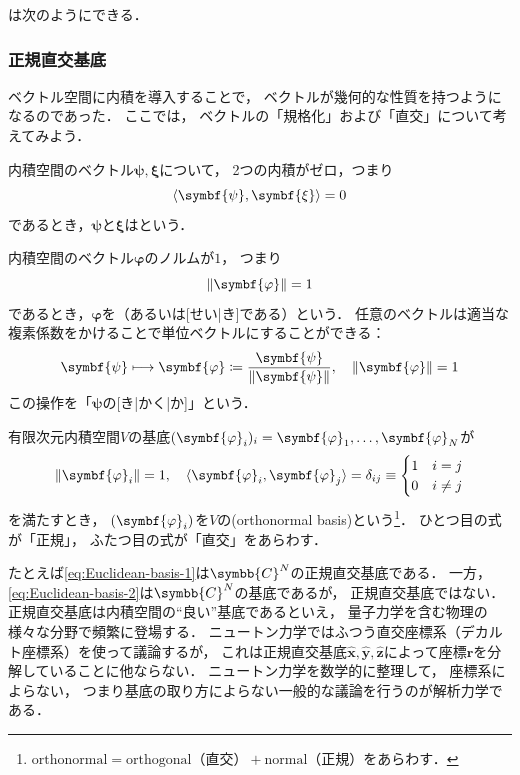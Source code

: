 \documentclass[
]{sotsu}
\newcommand{\bpsi}{\symbf{\psi}}
\newcommand{\bphi}{\symbf{\varphi}}
\newcommand{\bxi}{\symbf{\xi}}
\begin{document}
は次のようにできる．




\subsubsection{正規直交基底}
\label{sec:ONB}

ベクトル空間に内積を導入することで，
ベクトルが幾何的な性質を持つようになるのであった．
ここでは，
ベクトルの「規格化」および「直交」について考えてみよう．

内積空間のベクトル$\bpsi, \bxi$について，
2つの内積がゼロ，つまり
\begin{equation*}
    \label{eq:orthogonal}
    \iparen{\bpsi, \bxi} = 0
\end{equation*}
であるとき，$\bpsi$と$\bxi$はという．

内積空間のベクトル$\bphi$のノルムが$1$，
つまり
\begin{equation}
    \label{eq:normalization}
    \norm{\bphi} = 1
\end{equation}
であるとき，$\bphi$を（あるいは[せい|き]である）という．
任意のベクトルは適当な複素係数をかけることで単位ベクトルにすることができる：
\begin{equation*}
    \bpsi \longmapsto \bphi \coloneq \frac{\bpsi}{\norm{\bpsi}},
    \quad
    \norm{\bphi} = 1
\end{equation*}
この操作を「$\bpsi$の[き|かく|か]」という．

有限次元内積空間$V$の基底$\sequ{\bphi_i}[i] = \bphi_1, \dots, \bphi_N$が
\begin{equation}
    \label{eq:orthonormal}
    \norm{\bphi_i} = 1, 
    \quad
    \iparen{\bphi_i, \bphi_j} = 
    \kdelta_{ij} \equiv
    \begin{cases}
        1  &  i = j  \\
        0  &  i \neq j
    \end{cases}
\end{equation}
を満たすとき，
$\sequ{\bphi_i}$を$V$の(orthonormal basis)という\footnote{
    $\text{orthonormal} = \text{orthogonal（直交）} + \text{normal（正規）}$をあらわす．
}．
ひとつ目の式が「正規」，
ふたつ目の式が「直交」をあらわす．

たとえば\cref{eq:Euclidean-basis-1}は$\symbb{C}^N$の正規直交基底である．
一方，\cref{eq:Euclidean-basis-2}は$\symbb{C}^N$の基底であるが，
正規直交基底ではない．
正規直交基底は内積空間の``良い''基底であるといえ，
量子力学を含む物理の様々な分野で頻繁に登場する．
ニュートン力学ではふつう直交座標系（デカルト座標系）を使って議論するが，
これは正規直交基底$\hat{\symbf{x}}, \hat{\symbf{y}}, \hat{\symbf{z}}$によって座標$\symbf{r}$を分解していることに他ならない．
ニュートン力学を数学的に整理して，
座標系によらない，
つまり基底の取り方によらない一般的な議論を行うのが解析力学である．
\end{document}
